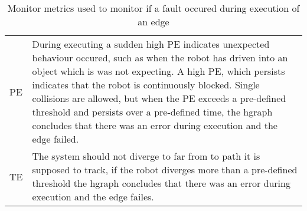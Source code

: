 \begin{table}[htb!]
\centering
\begin{tabular}[t]{l p{10cm}}
  \acf{PE}&  During executing a sudden high \ac{PE} indicates unexpected behaviour occured, such as when the robot has driven into an object which is was not expecting. A high \ac{PE}, which persists indicates that the robot is continuously blocked. Single collisions are allowed, but when the \ac{PE} exceeds a pre-defined threshold and persists over a pre-defined time, the \ac{hgraph} concludes that there was an error during execution and the edge failed.\\
  \acf{TE}& The system should not diverge to far from to path it is supposed to track, if the robot diverges more than a pre-defined threshold the \ac{hgraph} concludes that there was an error during execution and the edge failes. \\
\end{tabular}
\caption{Monitor metrics used to monitor if a fault occured during execution of an edge}%
\label{table:monitoring_edge_metrics}
\end{table}

